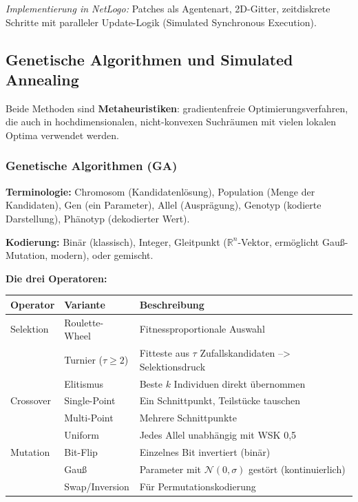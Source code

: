 \textit{Implementierung in NetLogo:} Patches als Agentenart, 2D-Gitter, zeitdiskrete Schritte mit paralleler Update-Logik (Simulated Synchronous Execution).

\newpage

\subsection{Genetische Algorithmen und Simulated Annealing}

Beide Methoden sind \textbf{Metaheuristiken}: gradientenfreie Optimierungsverfahren, die auch in hochdimensionalen, nicht-konvexen Suchräumen mit vielen lokalen Optima verwendet werden.

\subsubsection*{Genetische Algorithmen (GA)}


\textbf{Terminologie:} Chromosom (Kandidatenlösung), Population (Menge der Kandidaten), Gen (ein Parameter), Allel (Ausprägung), Genotyp (kodierte Darstellung), Phänotyp (dekodierter Wert).

\textbf{Kodierung:} Binär (klassisch), Integer, Gleitpunkt ($\mathbb{R}^n$-Vektor, ermöglicht Gauß-Mutation, modern), oder gemischt.

\textbf{Die drei Operatoren:}

\begin{table}[H]
\centering
\begin{tabular}{p{2.5cm} p{3cm} p{9cm}}
\hline
\textbf{Operator} & \textbf{Variante} & \textbf{Beschreibung} \\
\hline
Selektion & Roulette-Wheel & Fitnessproportionale Auswahl \\
 & Turnier ($\tau \geq 2$) & Fitteste aus $\tau$ Zufallskandidaten --> Selektionsdruck \\
 & Elitismus & Beste $k$ Individuen direkt übernommen \\
\hline
Crossover & Single-Point & Ein Schnittpunkt, Teilstücke tauschen \\
 & Multi-Point & Mehrere Schnittpunkte \\
 & Uniform & Jedes Allel unabhängig mit WSK 0,5 \\
\hline
Mutation & Bit-Flip & Einzelnes Bit invertiert (binär) \\
 & Gauß & Parameter mit $\mathcal{N}(0,\sigma)$ gestört (kontinuierlich) \\
 & Swap/Inversion & Für Permutationskodierung \\
\hline
\end{tabular}
\end{table}

